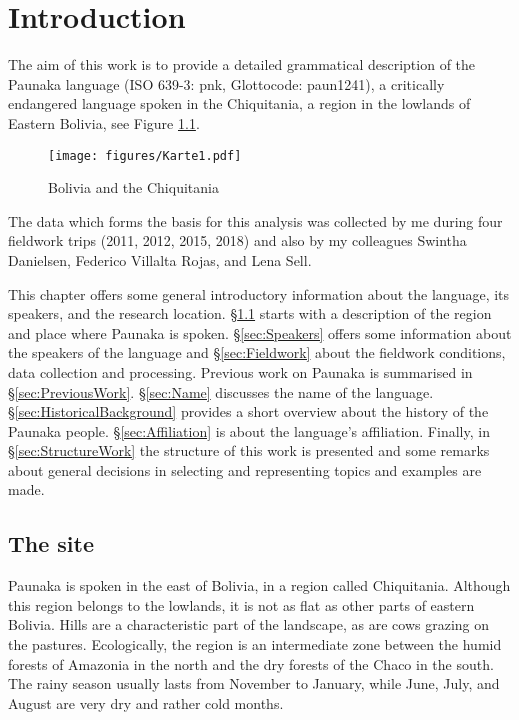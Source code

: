 
\chapter{Introduction}

The aim of this work is to provide a detailed grammatical description of the Paunaka language (ISO 639-3: pnk, Glottocode: paun1241), a critically endangered \citep[cf.][6]{Krauss2007}  language spoken in the Chiquitania, a region in the lowlands of Eastern Bolivia, see Figure \ref{fig:MapBolivia}. 


\begin{figure}[t]
\texttt{[image: figures/Karte1.pdf]}
\caption[Bolivia and the Chiquitania]{Bolivia and the Chiquitania }
\label{fig:MapBolivia}
\end{figure}

The data which forms the basis for this analysis was collected by me during four fieldwork trips (2011, 2012, 2015, 2018) and also by my colleagues Swintha Danielsen, Federico Villalta Rojas, and Lena Sell.


This chapter offers some general introductory information about the language, its speakers, and the research location. 
§\ref{sec:Site} starts with a description of the region and place where Paunaka is spoken. 
§\ref{sec:Speakers} offers some information about the speakers of the language 
and §\ref{sec:Fieldwork} about the fieldwork conditions, data collection and processing. 
Previous work on Paunaka is summarised in §\ref{sec:PreviousWork}. 
§\ref{sec:Name} discusses the name of the language.    
§\ref{sec:HistoricalBackground} provides a short overview about the history of the Paunaka people. 
§\ref{sec:Affiliation} is about the language’s affiliation.  
Finally, in §\ref{sec:StructureWork} the structure of this work is presented and some remarks about general decisions in selecting and representing topics and examples are made. 

\section{The site}\label{sec:Site}
Paunaka is spoken in the east of Bolivia, in a region called Chiquitania. Although this region belongs to the lowlands, it is not as flat as other parts of eastern Bolivia. Hills are a characteristic part of the landscape, as are cows grazing on the pastures.
Ecologically, the region is an intermediate zone between the humid forests of Amazonia in the north and the dry forests of the Chaco in the south. The rainy season usually lasts from November to January, while June, July, and August are very dry and rather cold months. 

